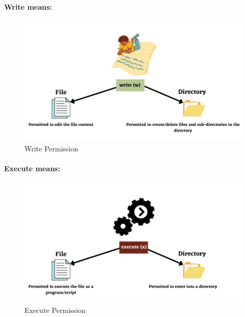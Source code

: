 \begin{flushleft}
	\paragraph{Write means:}
	\begin{figure}[h!]
		\centering
		\includegraphics[scale=0.4]{content/chapter5/images/9.png}
		\caption{Write Permission}
		\label{fig:write_permission}
	\end{figure}

	\paragraph{Execute means:}
	\begin{figure}[h!]
		\centering
		\includegraphics[scale=0.4]{content/chapter5/images/perm3.png}
		\caption{Execute Permission}
		\label{fig:execute_permission}
	\end{figure}



	
\end{flushleft}

\newpage

